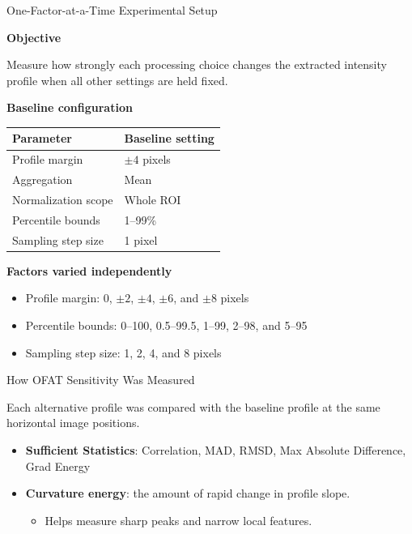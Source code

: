 \documentclass[aspectratio=169]{beamer}
\begin{document}
\begin{frame}{One-Factor-at-a-Time Experimental Setup}

\textbf{Objective}

Measure how strongly each processing choice changes the extracted intensity
profile when all other settings are held fixed.

\vspace{0.25cm}

\textbf{Baseline configuration}

\begin{table}
\centering
\small
\begin{tabular}{ll}
\toprule
Parameter & Baseline setting\\
\midrule
Profile margin & $\pm4$ pixels\\
Aggregation & Mean\\
Normalization scope & Whole ROI\\
Percentile bounds & 1--99\%\\
Sampling step size & 1 pixel\\
\bottomrule
\end{tabular}
\end{table}

\vspace{0.2cm}

\textbf{Factors varied independently}

\begin{itemize}
    \item Profile margin: $0$, $\pm2$, $\pm4$, $\pm6$, and $\pm8$ pixels
    \item Percentile bounds: 0--100, 0.5--99.5, 1--99, 2--98, and 5--95
    \item Sampling step size: 1, 2, 4, and 8 pixels
\end{itemize}

\end{frame}

\begin{frame}{How OFAT Sensitivity Was Measured}

\small

Each alternative profile was compared with the baseline profile at the same
horizontal image positions.

\begin{itemize}
    \item \textbf{Sufficient Statistics}: Correlation, MAD, RMSD, Max Absolute Difference, Grad Energy

    \item \textbf{Curvature energy}: the amount of rapid change in profile
    slope.
    \begin{itemize}
        \item Helps measure sharp peaks and narrow local features.
    \end{itemize}
\end{itemize}

\end{frame}
\end{document}
